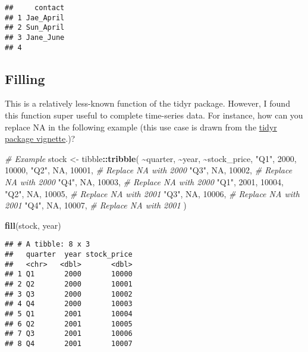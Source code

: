 \documentclass[
]{book}
\newenvironment{Shaded}{\begin{snugshade}}{\end{snugshade}}
\newcommand{\CommentTok}[1]{\textcolor[rgb]{0.56,0.35,0.01}{\textit{#1}}}
\newcommand{\DecValTok}[1]{\textcolor[rgb]{0.00,0.00,0.81}{#1}}
\newcommand{\KeywordTok}[1]{\textcolor[rgb]{0.13,0.29,0.53}{\textbf{#1}}}
\newcommand{\NormalTok}[1]{#1}
\newcommand{\OperatorTok}[1]{\textcolor[rgb]{0.81,0.36,0.00}{\textbf{#1}}}
\newcommand{\OtherTok}[1]{\textcolor[rgb]{0.56,0.35,0.01}{#1}}
\newcommand{\StringTok}[1]{\textcolor[rgb]{0.31,0.60,0.02}{#1}}
\begin{document}
\begin{verbatim}
##     contact
## 1 Jae_April
## 2 Sun_April
## 3 Jane_June
## 4
\end{verbatim}

\hypertarget{filling}{%
\subsection{Filling}\label{filling}}

This is a relatively less-known function of the tidyr package. However, I found this function super useful to complete time-series data. For instance, how can you replace NA in the following example (this use case is drawn from the \href{https://tidyr.tidyverse.org/reference/fill.html}{tidyr package vignette}.)?

\begin{Shaded}
\begin{Highlighting}[]
\CommentTok{\# Example}
\NormalTok{stock \textless{}{-}}\StringTok{ }\NormalTok{tibble}\OperatorTok{::}\KeywordTok{tribble}\NormalTok{(}
  \OperatorTok{\textasciitilde{}}\NormalTok{quarter, }\OperatorTok{\textasciitilde{}}\NormalTok{year, }\OperatorTok{\textasciitilde{}}\NormalTok{stock\_price,}
  \StringTok{"Q1"}\NormalTok{, }\DecValTok{2000}\NormalTok{, }\DecValTok{10000}\NormalTok{,}
  \StringTok{"Q2"}\NormalTok{, }\OtherTok{NA}\NormalTok{, }\DecValTok{10001}\NormalTok{, }\CommentTok{\# Replace NA with 2000}
  \StringTok{"Q3"}\NormalTok{, }\OtherTok{NA}\NormalTok{, }\DecValTok{10002}\NormalTok{, }\CommentTok{\# Replace NA with 2000}
  \StringTok{"Q4"}\NormalTok{, }\OtherTok{NA}\NormalTok{, }\DecValTok{10003}\NormalTok{, }\CommentTok{\# Replace NA with 2000}
  \StringTok{"Q1"}\NormalTok{, }\DecValTok{2001}\NormalTok{, }\DecValTok{10004}\NormalTok{,}
  \StringTok{"Q2"}\NormalTok{, }\OtherTok{NA}\NormalTok{, }\DecValTok{10005}\NormalTok{, }\CommentTok{\# Replace NA with 2001}
  \StringTok{"Q3"}\NormalTok{, }\OtherTok{NA}\NormalTok{, }\DecValTok{10006}\NormalTok{, }\CommentTok{\# Replace NA with 2001}
  \StringTok{"Q4"}\NormalTok{, }\OtherTok{NA}\NormalTok{, }\DecValTok{10007}\NormalTok{, }\CommentTok{\# Replace NA with 2001}
\NormalTok{)}

\KeywordTok{fill}\NormalTok{(stock, year)}
\end{Highlighting}
\end{Shaded}

\begin{verbatim}
## # A tibble: 8 x 3
##   quarter  year stock_price
##   <chr>   <dbl>       <dbl>
## 1 Q1       2000       10000
## 2 Q2       2000       10001
## 3 Q3       2000       10002
## 4 Q4       2000       10003
## 5 Q1       2001       10004
## 6 Q2       2001       10005
## 7 Q3       2001       10006
## 8 Q4       2001       10007
\end{verbatim}
\end{document}
